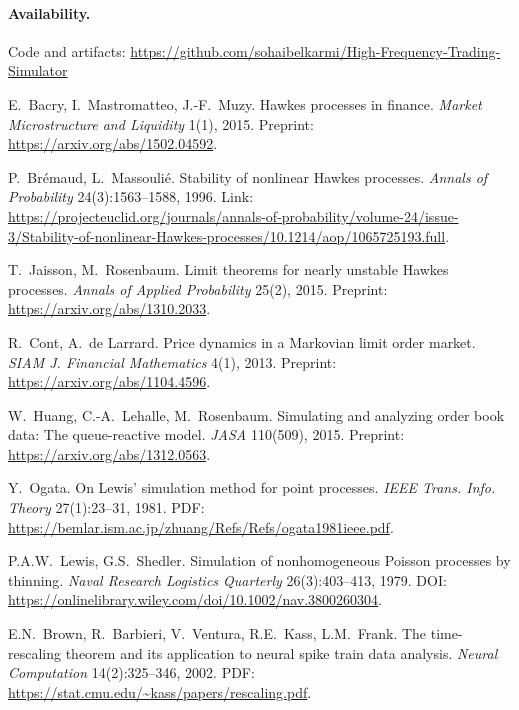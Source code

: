 \documentclass[11pt]{article}
\newcommand{\1}{\mathbbm{1}}
\begin{document}
\paragraph{Availability.} Code and artifacts: \url{https://github.com/sohaibelkarmi/High-Frequency-Trading-Simulator}

\begin{thebibliography}{99}\setlength{\itemsep}{2pt}

E.~Bacry, I.~Mastromatteo, J.-F.~Muzy.
Hawkes processes in finance.
\emph{Market Microstructure and Liquidity} 1(1), 2015.
Preprint: \url{https://arxiv.org/abs/1502.04592}.

P.~Br\'{e}maud, L.~Massouli\'{e}.
Stability of nonlinear Hawkes processes.
\emph{Annals of Probability} 24(3):1563--1588, 1996.
Link: \url{https://projecteuclid.org/journals/annals-of-probability/volume-24/issue-3/Stability-of-nonlinear-Hawkes-processes/10.1214/aop/1065725193.full}.

T.~Jaisson, M.~Rosenbaum.
Limit theorems for nearly unstable Hawkes processes.
\emph{Annals of Applied Probability} 25(2), 2015.
Preprint: \url{https://arxiv.org/abs/1310.2033}.

R.~Cont, A.~de Larrard.
Price dynamics in a Markovian limit order market.
\emph{SIAM J. Financial Mathematics} 4(1), 2013.
Preprint: \url{https://arxiv.org/abs/1104.4596}.

W.~Huang, C.-A.~Lehalle, M.~Rosenbaum.
Simulating and analyzing order book data: The queue-reactive model.
\emph{JASA} 110(509), 2015.
Preprint: \url{https://arxiv.org/abs/1312.0563}.

Y.~Ogata.
On Lewis' simulation method for point processes.
\emph{IEEE Trans. Info. Theory} 27(1):23--31, 1981.
PDF: \url{https://bemlar.ism.ac.jp/zhuang/Refs/Refs/ogata1981ieee.pdf}.

P.A.W.~Lewis, G.S.~Shedler.
Simulation of nonhomogeneous Poisson processes by thinning.
\emph{Naval Research Logistics Quarterly} 26(3):403--413, 1979.
DOI: \url{https://onlinelibrary.wiley.com/doi/10.1002/nav.3800260304}.

E.N.~Brown, R.~Barbieri, V.~Ventura, R.E.~Kass, L.M.~Frank.
The time-rescaling theorem and its application to neural spike train data analysis.
\emph{Neural Computation} 14(2):325--346, 2002.
PDF: \url{https://stat.cmu.edu/~kass/papers/rescaling.pdf}.


\end{thebibliography}
\end{document}
